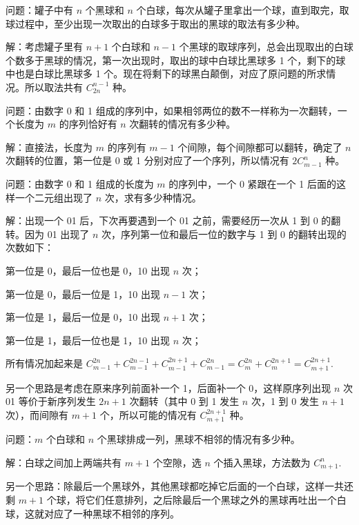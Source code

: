 问题：罐子中有 $ n $ 个黑球和 $ n $ 个白球，每次从罐子里拿出一个球，直到取完，取球过程中，至少出现一次取出的白球多于取出的黑球的取法有多少种。

解：考虑罐子里有 $ n + 1 $ 个白球和 $ n - 1 $ 个黑球的取球序列，总会出现取出的白球个数多于黑球的情况，第一次出现时，取出的球中白球比黑球多 1 个，剩下的球中也是白球比黑球多 1 个。现在将剩下的球黑白颠倒，对应了原问题的所求情况。所以取法共有 $ C_{2n}^{n-1} $ 种。

\vbox{}

问题：由数字 0 和 1 组成的序列中，如果相邻两位的数不一样称为一次翻转，一个长度为 $ m $ 的序列恰好有 $ n $ 次翻转的情况有多少种。

解：直接法，长度为 $ m $ 的序列有 $ m - 1 $ 个间隙，每个间隙都可以翻转，确定了 $ n $ 次翻转的位置，第一位是 0 或 1 分别对应了一个序列，所以情况有 $ 2 C_{m-1}^n $ 种。

\vbox{}

问题：由数字 0 和 1 组成的长度为 $ m $ 的序列中，一个 0 紧跟在一个 1 后面的这样一个二元组出现了 $ n $ 次，求有多少种情况。

解：出现一个 01 后，下次再要遇到一个 01 之前，需要经历一次从 1 到 0 的翻转。因为 01 出现了 $ n $ 次，序列第一位和最后一位的数字与 1 到 0 的翻转出现的次数如下：

第一位是 0，最后一位也是 0，10 出现 $ n $ 次；

第一位是 0，最后一位是 1，10 出现 $ n - 1 $ 次；

第一位是 1，最后一位是 0，10 出现 $ n + 1 $ 次；

第一位是 1，最后一位也是 1，10 出现 $ n $ 次；

\noindent 所有情况加起来是 $ C_{m-1}^{2n} + C_{m-1}^{2n-1} + C_{m-1}^{2n+1} + C_{m-1}^{2n} = C_m^{2n} + C_m^{2n+1} = C_{m+1}^{2n+1} $.

另一个思路是考虑在原来序列前面补一个 1，后面补一个 0，这样原序列出现 $ n $ 次 01 等价于新序列发生 $ 2n+1 $ 次翻转（其中 0 到 1 发生 $ n $ 次，1 到 0 发生 $ n + 1 $ 次），而间隙有 $ m + 1 $ 个，所以可能的情况有 $ C_{m+1}^{2n+1} $ 种。

\vbox{}

问题：$ m $ 个白球和 $ n $ 个黑球排成一列，黑球不相邻的情况有多少种。

解：白球之间加上两端共有 $ m + 1$ 个空隙，选 $ n $ 个插入黑球，方法数为 $ C_{m+1}^n $.

另一个思路：除最后一个黑球外，其他黑球都吃掉它后面的一个白球，这样一共还剩 $ m + 1 $ 个球，将它们任意排列，之后除最后一个黑球之外的黑球再吐出一个白球，这就对应了一种黑球不相邻的序列。

